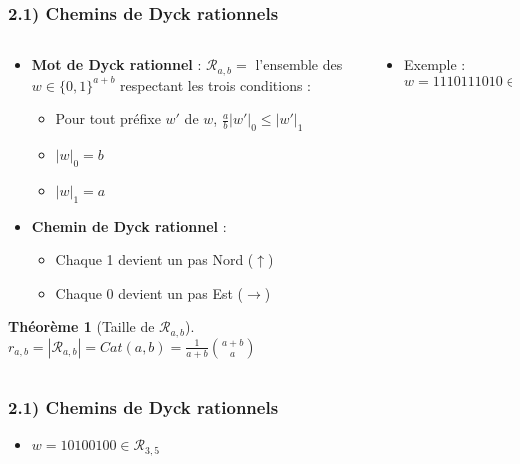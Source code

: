 \documentclass{beamer}
\newtheorem*{thm}{Théorème}
\begin{document}
\begin{frame} %
    \frametitle{2.1) Chemins de Dyck rationnels}
    \begin{columns}
        \begin{column}{0.65\textwidth}
            \begin{itemize}
                \item \textbf{Mot de Dyck rationnel} : $\mathcal{R}_{a,b} =$
                    l'ensemble des $w \in \{0,1\}^{a+b}$ respectant les trois
                    conditions :
                \begin{itemize}
                    \item Pour tout préfixe $w'$ de $w$, $\frac{a}{b}|w'|_0
                     \leqslant |w'|_1$
                     \item $|w|_0 = b$
                     \item $|w|_1 = a$
                \end{itemize}
                \item \textbf{Chemin de Dyck rationnel} :
                \begin{itemize}
                    \item Chaque 1 devient un pas Nord ($\uparrow$)
                    \item Chaque 0 devient un pas Est ($\rightarrow$)
                \end{itemize}
            \end{itemize}

            \begin{thm} [Taille de $\mathcal{R}_{a,b}$]           
                $\displaystyle r_{a,b} = |\mathcal{R}_{a,b}|
                = Cat(a,b) = \frac{1}{a+b}\binom{a+b}{a}$
            \end{thm}

        \end{column}
        \begin{column}{0.35\textwidth}
            \begin{itemize}
                \item Exemple : $w = 1110111010 \in \mathcal{R}_{7,3}$
            \end{itemize}
            
        \end{column}
    \end{columns}
\end{frame}

\begin{frame} %
    \frametitle{2.1) Chemins de Dyck rationnels}
    \begin{itemize}
        \item $w = 10100100 \in \mathcal{R}_{3,5}$
    \end{itemize}
    
\end{frame}
\end{document}

